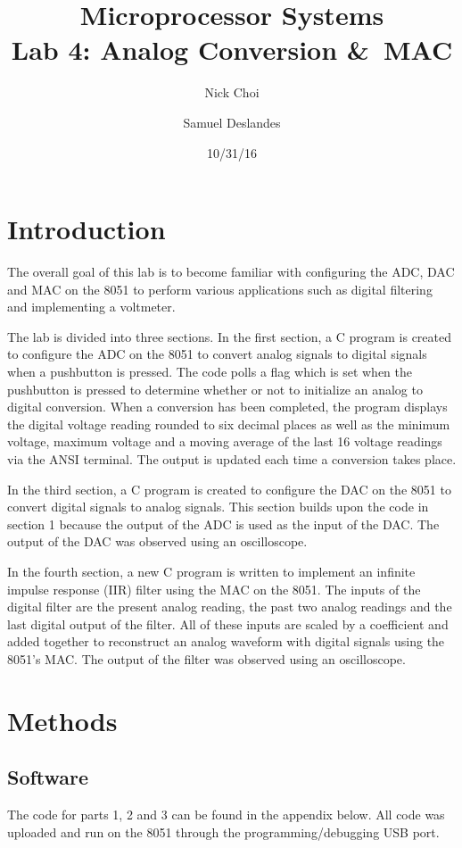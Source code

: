 \documentclass[12pt]{article}
\begin{document}
\title{Microprocessor Systems\\ Lab 4: Analog Conversion \&\ MAC }
\author{Nick Choi \and Samuel Deslandes}
\date{10/31/16}
\maketitle
\pagebreak
\section{Introduction}

The overall goal of this lab is to become familiar with configuring the ADC, DAC and MAC on the 8051 to perform various applications such as digital filtering and implementing a voltmeter. 

The lab is divided into three sections. In the first section, a C program is created to configure the ADC on the 8051 to convert analog signals to digital signals when a pushbutton is pressed. The code polls a flag which is set when the pushbutton is pressed to determine whether or not to initialize an analog to digital conversion. When a conversion has been completed, the program displays the digital voltage reading rounded to six decimal places as well as the minimum voltage, maximum voltage and a moving average of the last 16 voltage readings via the ANSI terminal. The output is updated each time a conversion takes place. 

In the third section, a C program is created to configure the DAC on the 8051 to convert digital signals to analog signals. This section builds upon the code in section 1 because the output of the ADC is used as the input of the DAC. The output of the DAC was observed using an oscilloscope. 

In the fourth section, a new C program is written to implement an infinite impulse response (IIR) filter using the MAC on the 8051. The inputs of the digital filter are the present analog reading, the past two analog readings and the last digital output of the filter. All of these inputs are scaled by a coefficient and added together to reconstruct an analog waveform with digital signals using the 8051’s MAC. The output of the filter was observed using an oscilloscope. 

\section{Methods}
\subsection{Software}
The code for parts 1, 2 and 3 can be found in the appendix below. All code was uploaded and run on the 8051 through the programming/debugging USB port. 
\end{document}
